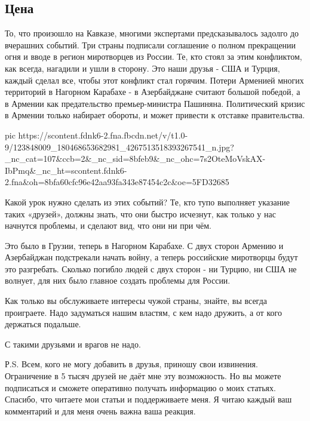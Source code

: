  
 
 

\subsection{Цена }
\label{sec:10_11_2020.fb.alex_belyy.1.cena_druzhby_kavkaz}

То, что произошло на Кавказе, многими экспертами предсказывалось задолго до
вчерашних событий. Три страны подписали соглашение о полном прекращении огня и
вводе в регион миротворцев из России. Те, кто стоял за этим конфликтом, как
всегда, нагадили и ушли в сторону. Это наши друзья - США и Турция, каждый
сделал все, чтобы этот конфликт стал горячим. Потери Арменией многих территорий
в Нагорном Карабахе - в Азербайджане считают большой победой, а в Армении как
предательство премьер-министра Пашиняна. Политический кризис в Армении только
набирает обороты, и может привести к отставке правительства.

\ifcmt
pic https://scontent.fdnk6-2.fna.fbcdn.net/v/t1.0-9/123848009_180468653682981_4267513518393267541_n.jpg?_nc_cat=107&ccb=2&_nc_sid=8bfeb9&_nc_ohc=7s2OteMoVskAX-IbPmq&_nc_ht=scontent.fdnk6-2.fna&oh=8bfa60cfc96e42aa93fa343e87454c2c&oe=5FD32685
\fi

Какой урок нужно сделать из этих событий? Те, кто тупо выполняет указание таких
«друзей», должны знать, что они быстро исчезнут, как только у нас начнутся
проблемы, и сделают вид, что они ни при чём. 

Это было в Грузии, теперь в Нагорном Карабахе. С двух сторон Армению и
Азербайджан подстрекали начать войну, а теперь российские миротворцы будут это
разгребать. Сколько погибло людей с двух сторон - ни Турцию, ни США не волнует,
для них было главное создать проблемы для России. 

Как только вы обслуживаете интересы чужой страны, знайте, вы всегда проиграете.
Надо задуматься нашим властям, с кем надо дружить, а от кого держаться
подальше.  

С такими друзьями и врагов не надо.         

Р.S. Всем, кого не могу добавить в друзья, приношу свои извинения. Ограничение
в 5 тысяч друзей не даёт мне эту возможность. Но вы можете подписаться и
сможете оперативно получать информацию о моих статьях. Спасибо, что читаете мои
статьи и поддерживаете меня. Я читаю каждый ваш комментарий и для меня очень
важна ваша реакция.


